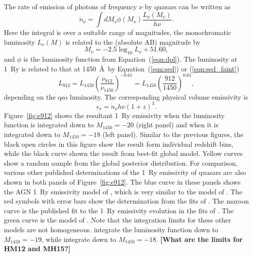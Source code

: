 \documentclass[a4paper,fleqn,usenatbib]{mnras}
\begin{document}
The rate of emission of photons of frequency $\nu$ by quasars can be
written as
\begin{equation}
\dot n_\nu = \int dM_\nu \phi(M_\nu) \frac{L_\nu(M_\nu)}{h\nu}.
\end{equation}
Here the integral is over a suitable range of magnitudes, the
monochromatic luminosity $L_\nu(M)$ is related to the (absolute AB)
magnitude by \citep{1983ApJ...266..713O}
\begin{equation}
M_\nu = -2.5\log_{10}L_\nu+51.60,
\end{equation}
and $\phi$ is the luminosity function from Equation~(\ref{eqn:dpl}).
The luminosity at 1~Ry is related to that at 1450~\AA\ by
Equation~(\ref{eqn:sed}) or (\ref{eqn:sed_faint})
\begin{equation}
  L_{912}=L_{1450}\left(\frac{\nu_{912}}{\nu_{1450}}\right)^{-0.61}=L_{1450}\left(\frac{912}{1450}\right)^{0.61},
\end{equation}
depending on the qso luminosity.  The corresponding physical volume
emissivity is 
\begin{equation}
\epsilon_\nu = \dot n_\nu h\nu (1+z)^3.
\label{eqn:epsilon}
\end{equation}
Figure~\ref{fig:e912} shows the resultant 1~Ry emissivity when the
luminosity function is integrated down to $M_{1450}=-20$ (right panel)
and when it is integrated down to $M_{1450}=-18$ (left panel).
Similar to the previous figures, the black open circles in this figure
show the result form individual redshift bins, while the black curve
shown the result from best-fit global model.  Yellow curves show a
random sample from the global posterior distribution.  For comparison,
various other published determinations of the 1~Ry emissivity of
quasars are also shown in both panels of Figure~\ref{fig:e912}.  The
blue curve in these panels shows the AGN 1~Ry emissivity model of
\citet{2012ApJ...746..125H}, which is very similar to the model of
\citet{2007ApJ...654..731H}.  The red symbols with error bars show the
determination from the fits of \citet{2015AA...578A..83G}.  The maroon
curve is the published fit to the 1~Ry emissivity evolution in the
fits of \citet{2017MNRAS.466.1160M}.  The green curve is the model of
\citet{2015ApJ...813L...8M}.  Note that the integration limits for
these other models are not homogeneous.  \citet{2017MNRAS.466.1160M}
integrate the luminosity function down to $M_{1450}=-19$, while
\citet{2015AA...578A..83G} integrate down to $M_{1450}=-18$.
\textbf{[What are the limits for HM12 and MH15?]}
\end{document}
